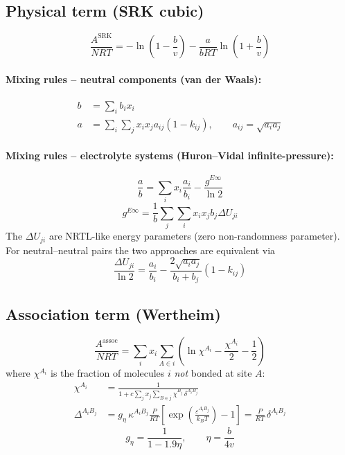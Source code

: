 \documentclass[11pt]{article}
\begin{document}
\subsection{Physical term (SRK cubic)}
\begin{equation}
  \frac{A^{\text{SRK}}}{NRT} = -\ln\!\left(1 - \frac{b}{v}\right)
    - \frac{a}{bRT}\ln\!\left(1 + \frac{b}{v}\right)
\end{equation}

\paragraph{Mixing rules -- neutral components (van der Waals):}
\begin{align}
  b &= \sum_i b_i x_i \\
  a &= \sum_i \sum_j x_i x_j a_{ij}(1-k_{ij}), \qquad a_{ij} = \sqrt{a_i a_j}
\end{align}

\paragraph{Mixing rules -- electrolyte systems (Huron--Vidal infinite-pressure):}
\begin{equation}
  \frac{a}{b} = \sum_i x_i \frac{a_i}{b_i} - \frac{g^{E\infty}}{\ln 2}
\end{equation}
\begin{equation}
  g^{E\infty} = \frac{1}{b}\sum_j\sum_i x_i x_j b_j \Delta U_{ji}
\end{equation}
The $\Delta U_{ji}$ are NRTL-like energy parameters (zero non-randomness parameter).
For neutral--neutral pairs the two approaches are equivalent via
\begin{equation}
  \frac{\Delta U_{ji}}{\ln 2} = \frac{a_i}{b_i} - \frac{2\sqrt{a_i a_j}}{b_i+b_j}(1-k_{ij})
\end{equation}

\subsection{Association term (Wertheim)}
\begin{equation}
  \frac{A^{\text{assoc}}}{NRT}
    = \sum_i x_i \sum_{A\in i}
      \left(\ln\chi^{A_i} - \frac{\chi^{A_i}}{2} - \frac{1}{2}\right)
\end{equation}
where $\chi^{A_i}$ is the fraction of molecules $i$ \emph{not} bonded at site $A$:
\begin{align}
  \chi^{A_i} &= \frac{1}{1 + c\sum_j x_j \sum_{B\in j} \chi^{B_j}\,\delta^{A_iB_j}} \\
  \Delta^{A_iB_j} &= g_\eta\,\kappa^{A_iB_j}\frac{P}{RT}
    \left[\exp\!\left(\frac{\varepsilon^{A_iB_j}}{k_BT}\right)-1\right]
    = \frac{P}{RT}\,\delta^{A_iB_j}
\end{align}
\begin{equation}
  g_\eta = \frac{1}{1 - 1.9\eta}, \qquad \eta = \frac{b}{4v}
\end{equation}
\end{document}
